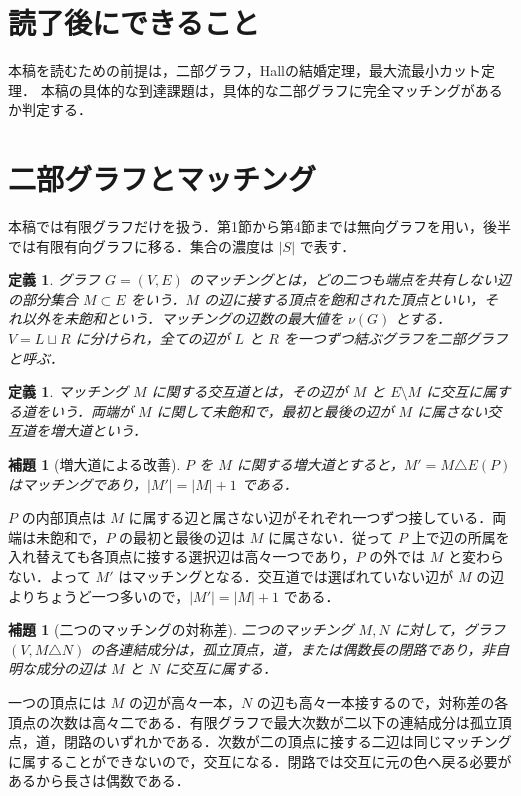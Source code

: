 \documentclass[a5paper,10pt,onecolumn]{jsarticle}
\makeatletter
\theoremstyle{mathnotetheorem}
\newtheorem{definition}[theorem]{定義}
\newtheorem{lemma}[theorem]{補題}
\renewcommand{\proofname}{証明}
\renewenvironment{proof}[1][\proofname]{%
  \par\pushQED{\qed}\normalfont\topsep4\p@\@plus2\p@\relax
  \trivlist\item[\hskip\labelsep\bfseries #1]\ignorespaces
}{\popQED\endtrivlist\@endpefalse}
\makeatother
\begin{document}
\section*{読了後にできること}
本稿を読むための前提は，二部グラフ，Hallの結婚定理，最大流最小カット定理．
本稿の具体的な到達課題は，具体的な二部グラフに完全マッチングがあるか判定する．

\section{二部グラフとマッチング}
本稿では有限グラフだけを扱う．第1節から第4節までは無向グラフを用い，後半では有限有向グラフに移る．集合の濃度は $|S|$ で表す．

\begin{definition}
グラフ $G=(V,E)$ の\emph{マッチング}とは，どの二つも端点を共有しない辺の部分集合 $M\subset E$ をいう．$M$ の辺に接する頂点を\emph{飽和された}頂点といい，それ以外を\emph{未飽和}という．マッチングの辺数の最大値を $\nu(G)$ とする．$V=L\sqcup R$ に分けられ，全ての辺が $L$ と $R$ を一つずつ結ぶグラフを二部グラフと呼ぶ．
\end{definition}

\begin{definition}
マッチング $M$ に関する\emph{交互道}とは，その辺が $M$ と $E\setminus M$ に交互に属する道をいう．両端が $M$ に関して未飽和で，最初と最後の辺が $M$ に属さない交互道を\emph{増大道}という．
\end{definition}

\begin{lemma}[増大道による改善]\label{lem:augment}
$P$ を $M$ に関する増大道とすると，$M'=M\triangle E(P)$ はマッチングであり，$|M'|=|M|+1$ である．
\end{lemma}
\begin{proof}
$P$ の内部頂点は $M$ に属する辺と属さない辺がそれぞれ一つずつ接している．両端は未飽和で，$P$ の最初と最後の辺は $M$ に属さない．従って $P$ 上で辺の所属を入れ替えても各頂点に接する選択辺は高々一つであり，$P$ の外では $M$ と変わらない．よって $M'$ はマッチングとなる．交互道では選ばれていない辺が $M$ の辺よりちょうど一つ多いので，$|M'|=|M|+1$ である．
\end{proof}

\begin{lemma}[二つのマッチングの対称差]\label{lem:symdiff}
二つのマッチング $M,N$ に対して，グラフ $(V,M\triangle N)$ の各連結成分は，孤立頂点，道，または偶数長の閉路であり，非自明な成分の辺は $M$ と $N$ に交互に属する．
\end{lemma}
\begin{proof}
一つの頂点には $M$ の辺が高々一本，$N$ の辺も高々一本接するので，対称差の各頂点の次数は高々二である．有限グラフで最大次数が二以下の連結成分は孤立頂点，道，閉路のいずれかである．次数が二の頂点に接する二辺は同じマッチングに属することができないので，交互になる．閉路では交互に元の色へ戻る必要があるから長さは偶数である．
\end{proof}
\end{document}
